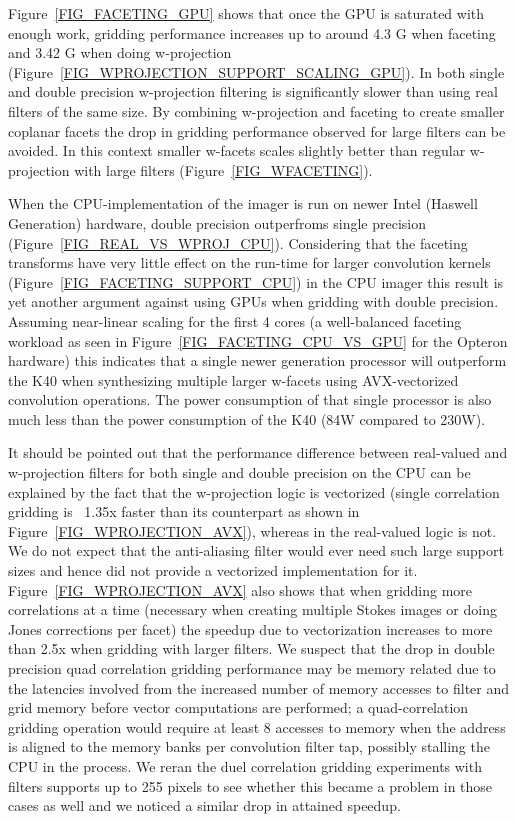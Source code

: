 Figure~\ref{FIG_FACETING_GPU} shows that once the GPU is saturated with enough work, gridding performance increases up to around 4.3 G when faceting and 3.42 G when doing 
w-projection (Figure~\ref{FIG_WPROJECTION_SUPPORT_SCALING_GPU}). In both single and double precision w-projection filtering is significantly slower than using real filters 
of the same size. By combining w-projection and faceting to create smaller coplanar facets the drop in gridding performance observed for large filters can be avoided. In this
context smaller w-facets scales slightly better than regular w-projection with large filters (Figure~\ref{FIG_WFACETING}).

When the CPU-implementation of the imager is run on newer Intel (Haswell Generation) hardware, double precision outperfroms single precision (Figure~\ref{FIG_REAL_VS_WPROJ_CPU}). Considering that
the faceting transforms have very little effect on the run-time for larger convolution kernels (Figure~\ref{FIG_FACETING_SUPPORT_CPU}) in the CPU imager this result is yet another argument against using GPUs when gridding
with double precision. Assuming near-linear scaling for the first 4 cores (a well-balanced faceting workload as seen in Figure~\ref{FIG_FACETING_CPU_VS_GPU} for the Opteron hardware) this indicates that
a single newer generation processor will outperform the K40 when synthesizing multiple larger w-facets using AVX-vectorized convolution operations. The power consumption of that single processor is also much less than the power
consumption of the K40 (84W compared to 230W).

It should be pointed out that the performance difference between real-valued and w-projection filters for both single and double precision on the CPU can be explained by the fact that the w-projection logic is vectorized (single correlation
gridding is ~1.35x faster than its counterpart as shown in Figure~\ref{FIG_WPROJECTION_AVX}), whereas in the real-valued logic is not. We do not expect that the anti-aliasing filter would ever need such large support sizes and hence did not
provide a vectorized implementation for it. Figure~\ref{FIG_WPROJECTION_AVX} also shows that when gridding more correlations at a time (necessary when creating multiple Stokes images or doing Jones corrections per facet) the speedup 
due to vectorization increases to more than 2.5x when gridding with larger filters. We suspect that the drop in double precision quad correlation gridding performance may be memory related due to the latencies involved from the 
increased number of memory accesses to filter and grid memory before vector computations are performed; a quad-correlation gridding operation would require at least 8 accesses to memory when the address is aligned to the memory 
banks per convolution filter tap, possibly stalling the CPU in the process. We reran the duel correlation gridding experiments with filters supports up to 255 pixels to see whether this became a problem
in those cases as well and we noticed a similar drop in attained speedup.

